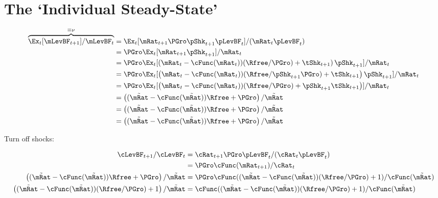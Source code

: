 \documentclass[\econtexRoot/BufferStockTheory]{subfiles}
\begin{document}
\pagebreak
\section{The `Individual Steady-State'}\label{sec:SteadyStateInd}

\begin{align*}
 \overbrace{\Ex_{t}[\mLevBF_{t+1}]/\mLevBF_{t}}^{\equiv\nu} & = \Ex_{t}[\mRat_{t+1}\PGro\pShk_{t+1}\pLevBF_{t}]/(\mRat_{t}\pLevBF_{t}) 
    \\  &= \PGro\Ex_{t}[\mRat_{t+1}\pShk_{t+1}]/\mRat_{t}
    \\  &= \PGro\Ex_{t}[\left(\mRat_{t}-\cFunc(\mRat_{t}))(\Rfree/\PGro)+\tShk_{t+1}\right)\pShk_{t+1}]/\mRat_{t}
    \\  &= \PGro\Ex_{t}[\left(\mRat_{t}-\cFunc(\mRat_{t}))(\Rfree/\pShk_{t+1}\PGro)+\tShk_{t+1}\right)\pShk_{t+1}]/\mRat_{t}
  \\  &= \PGro\Ex_{t}[\left(\mRat_{t}-\cFunc(\mRat_{t}))(\Rfree/\PGro)+\pShk_{t+1}\tShk_{t+1}\right)]/\mRat_{t}                                         
  \\  &= \left((\tilde{\mRat}-\cFunc(\tilde{\mRat}))\Rfree+\PGro\right)/\tilde{\mRat} 
   \\  &= \left((\tilde{\mRat}-\cFunc(\tilde{\mRat}))\Rfree+\PGro\right)/\tilde{\mRat} 
   \\  &= \left((\tilde{\mRat}-\cFunc(\tilde{\mRat}))\Rfree+\PGro\right)/\tilde{\mRat} 
  \end{align*}

  Turn off shocks:

  \begin{align*}
\cLevBF_{t+1}/\cLevBF_{t} 
 & = \cRat_{t+1}\PGro\pLevBF_{t}/(\cRat_{t}\pLevBF_{t})
\\ & = \PGro\cFunc(\mRat_{t+1})/\cRat_{t}
\\ \left((\tilde{\mRat}-\cFunc(\tilde{\mRat}))\Rfree+\PGro\right)/\tilde{\mRat}   & = \PGro\cFunc((\tilde{\mRat}-\cFunc(\tilde{\mRat}))(\Rfree/\PGro)+1)/\cFunc(\tilde{\mRat})
\\ \left((\tilde{\mRat}-\cFunc(\tilde{\mRat}))(\Rfree/\PGro)+1\right)/\tilde{\mRat}   & = \cFunc((\tilde{\mRat}-\cFunc(\tilde{\mRat}))(\Rfree/\PGro)+1)/\cFunc(\tilde{\mRat})
  \end{align*}
\end{document}
